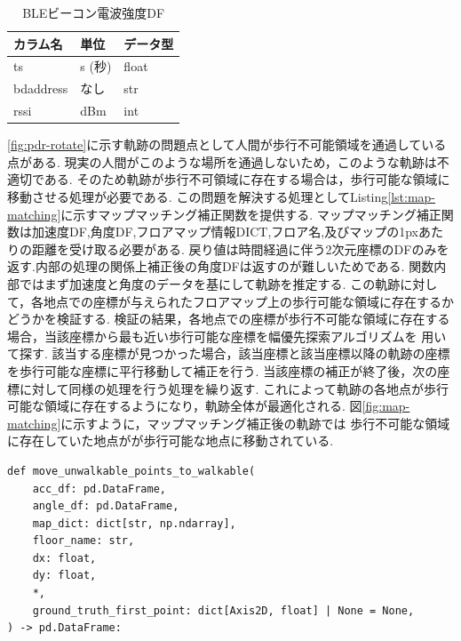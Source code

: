\begin{table}[h]
	\centering
	\begin{tabular}{lll}
		\toprule
		カラム名      & 単位    & データ型  \\
		\midrule
		ts        & s (秒) & float \\
		bdaddress & なし    & str   \\
		rssi      & dBm   & int   \\
		\bottomrule
	\end{tabular}
	\caption{BLEビーコン電波強度DF}
\end{table}

\ref{fig:pdr-rotate}に示す軌跡の問題点として人間が歩行不可能領域を通過している点がある.
現実の人間がこのような場所を通過しないため，このような軌跡は不適切である.
そのため軌跡が歩行不可領域に存在する場合は，歩行可能な領域に移動させる処理が必要である.
この問題を解決する処理としてListing\ref{lst:map-matching}に示すマップマッチング補正関数を提供する.
マップマッチング補正関数は加速度DF,角度DF,フロアマップ情報DICT,フロア名,及びマップの1pxあたりの距離を受け取る必要がある.
戻り値は時間経過に伴う2次元座標のDFのみを返す.内部の処理の関係上補正後の角度DFは返すのが難しいためである.
関数内部ではまず加速度と角度のデータを基にして軌跡を推定する.
この軌跡に対して，各地点での座標が与えられたフロアマップ上の歩行可能な領域に存在するかどうかを検証する.
検証の結果，各地点での座標が歩行不可能な領域に存在する場合，当該座標から最も近い歩行可能な座標を幅優先探索アルゴリズムを
用いて探す.
該当する座標が見つかった場合，該当座標と該当座標以降の軌跡の座標を歩行可能な座標に平行移動して補正を行う.
当該座標の補正が終了後，次の座標に対して同様の処理を行う処理を繰り返す.
これによって軌跡の各地点が歩行可能な領域に存在するようになり，軌跡全体が最適化される.
図\ref{fig:map-matching}に示すように，マップマッチング補正後の軌跡では
歩行不可能な領域に存在していた地点がが歩行可能な地点に移動されている.

\begin{lstlisting}[caption={マップマッチング補正}, label=lst:map-matching]
def move_unwalkable_points_to_walkable(
    acc_df: pd.DataFrame,
    angle_df: pd.DataFrame,
    map_dict: dict[str, np.ndarray],
    floor_name: str,
    dx: float,
    dy: float,
    *,
    ground_truth_first_point: dict[Axis2D, float] | None = None,
) -> pd.DataFrame:

\end{lstlisting}

